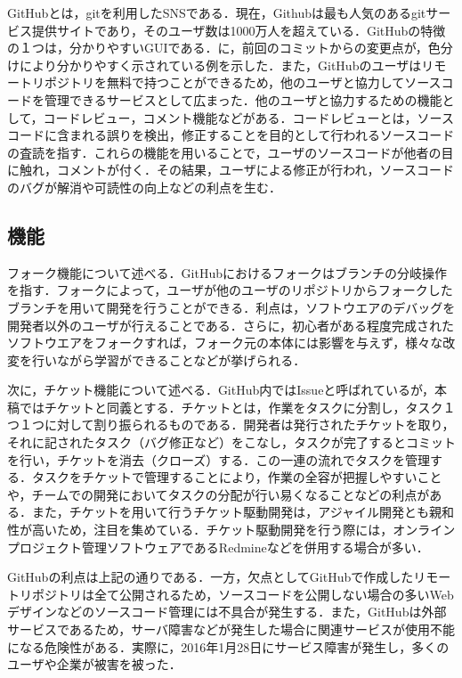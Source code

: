 \documentclass[a4j,9pt,twocolumn]{jsarticle}
\begin{document}
GitHubとは，gitを利用したSNSである．現在，Githubは最も人気のあるgitサービス提供サイトであり，そのユーザ数は1000万人を超えている\cite{github}．GitHubの特徴の１つは，分かりやすいGUIである．に，前回のコミットからの変更点が，色分けにより分かりやすく示されている例を示した．また，GitHubのユーザはリモートリポジトリを無料で持つことができるため，他のユーザと協力してソースコードを管理できるサービスとして広まった．他のユーザと協力するための機能として，コードレビュー，コメント機能などがある．コードレビューとは，ソースコードに含まれる誤りを検出，修正することを目的として行われるソースコードの査読を指す．これらの機能を用いることで，ユーザのソースコードが他者の目に触れ，コメントが付く．その結果，ユーザによる修正が行われ，ソースコードのバグが解消や可読性の向上などの利点を生む．

\subsection{機能}
フォーク機能について述べる．GitHubにおけるフォークはブランチの分岐操作を指す．フォークによって，ユーザが他のユーザのリポジトリからフォークしたブランチを用いて開発を行うことができる．利点は，ソフトウエアのデバッグを開発者以外のユーザが行えることである．さらに，初心者がある程度完成されたソフトウエアをフォークすれば，フォーク元の本体には影響を与えず，様々な改変を行いながら学習ができることなどが挙げられる．

次に，チケット機能について述べる．GitHub内ではIssueと呼ばれているが，本稿ではチケットと同義とする．チケットとは，作業をタスクに分割し，タスク１つ１つに対して割り振られるものである．開発者は発行されたチケットを取り，それに記されたタスク（バグ修正など）をこなし，タスクが完了するとコミットを行い，チケットを消去（クローズ）する．この一連の流れでタスクを管理する．タスクをチケットで管理することにより，作業の全容が把握しやすいことや，チームでの開発においてタスクの分配が行い易くなることなどの利点がある．また，チケットを用いて行うチケット駆動開発は，アジャイル開発とも親和性が高いため，注目を集めている．チケット駆動開発を行う際には，オンラインプロジェクト管理ソフトウェアであるRedmineなどを併用する場合が多い．

GitHubの利点は上記の通りである．一方，欠点としてGitHubで作成したリモートリポジトリは全て公開されるため，ソースコードを公開しない場合の多いWebデザインなどのソースコード管理には不具合が発生する．また，GitHubは外部サービスであるため，サーバ障害などが発生した場合に関連サービスが使用不能になる危険性がある．実際に，2016年1月28日にサービス障害が発生し，多くのユーザや企業が被害を被った\cite{news}．
\end{document}
